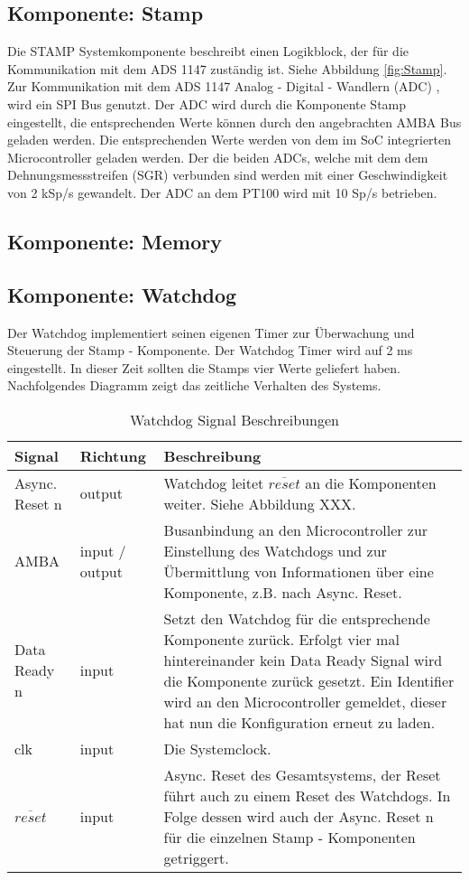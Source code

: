 \subsection{Komponente: Stamp}
\label{bes:Stamp}
Die STAMP Systemkomponente beschreibt einen Logikblock, der für die Kommunikation mit dem ADS 1147 zuständig ist. Siehe Abbildung \ref{fig:Stamp}. 
Zur Kommunikation mit dem ADS 1147 Analog - Digital - Wandlern (ADC) , wird ein SPI Bus genutzt. Der ADC wird durch die Komponente Stamp eingestellt, die entsprechenden Werte können durch den angebrachten AMBA Bus geladen werden. Die entsprechenden Werte werden von dem im SoC integrierten Microcontroller geladen werden. 
Der die beiden ADCs, welche mit dem dem Dehnungsmessstreifen (SGR) verbunden sind werden mit einer Geschwindigkeit von 2 kSp/s gewandelt. Der ADC an dem PT100 wird mit 10 Sp/s betrieben. 
\subsection{Komponente: Memory}
\label{bes:memory}
\subsection{Komponente: Watchdog}
Der Watchdog implementiert seinen eigenen Timer zur Überwachung und Steuerung der Stamp - Komponente. Der Watchdog Timer wird auf 2 ms eingestellt. In dieser Zeit sollten die Stamps vier Werte geliefert haben. Nachfolgendes Diagramm zeigt das zeitliche Verhalten des Systems. 
\renewcommand{\arraystretch}{1.5}
\begin{table}[htb]
  \begin{tabular}{|p{.3\linewidth}|p{.15\linewidth}|p{.45\linewidth}|}\hline
  \textbf{Signal} & \textbf{Richtung} & \textbf{Beschreibung} \\ \hline
  Async. Reset n & output & Watchdog leitet $\overline{reset}$ an die Komponenten weiter. Siehe Abbildung XXX. \\ \hline 
  AMBA & input / output & Busanbindung an den Microcontroller zur Einstellung des Watchdogs und zur Übermittlung von Informationen über eine Komponente, z.B. nach Async. Reset. \\ \hline
  Data Ready n & input & Setzt den Watchdog für die entsprechende Komponente zurück. Erfolgt vier mal hintereinander kein Data Ready Signal wird die Komponente zurück gesetzt. Ein Identifier wird an den Microcontroller gemeldet, dieser hat nun die Konfiguration erneut zu laden. \\ \hline
  clk & input & Die Systemclock. \\ \hline 
  $\overline{reset} $ & input & Async. Reset des Gesamtsystems, der Reset führt auch zu einem Reset des Watchdogs. In Folge dessen wird auch der Async. Reset n für die einzelnen Stamp  - Komponenten getriggert. \\ \hline
  \end{tabular}
   \caption{Watchdog Signal Beschreibungen}
\end{table}
\renewcommand{\arraystretch}{1.0}